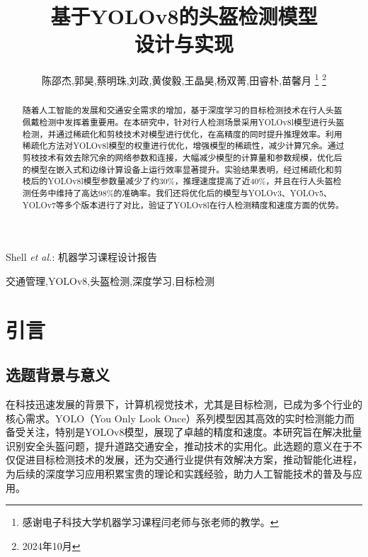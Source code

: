 \documentclass[journal]{IEEEtran}
\numberwithin{figure}{section}%
\begin{document}
\title{基于YOLOv8的头盔检测模型\\设计与实现}

\author{陈邵杰,郭昊,蔡明珠,刘政,黄俊毅,王晶昊,杨双菁,田睿朴,苗馨月%
\thanks{感谢电子科技大学机器学习课程闫老师与张老师的教学。}%
\thanks{2024年10月}}


%
{Shell \MakeLowercase{\textit{et al.}}: 机器学习课程设计报告}


\maketitle

\begin{abstract}
随着人工智能的发展和交通安全需求的增加，基于深度学习的目标检测技术在行人头盔佩戴检测中发挥着重要用。在本研究中，针对行人检测场景采用YOLOv8l模型进行头盔检测，并通过稀疏化和剪枝技术对模型进行优化，在高精度的同时提升推理效率。利用稀疏化方法对YOLOv8l模型的权重进行优化，增强模型的稀疏性，减少计算冗余。通过剪枝技术有效去除冗余的网络参数和连接，大幅减少模型的计算量和参数规模，优化后的模型在嵌入式和边缘计算设备上运行效率显著提升。实验结果表明，经过稀疏化和剪枝后的YOLOv8l模型参数量减少了约30\%，推理速度提高了近40\%，并且在行人头盔检测任务中维持了高达98\%的准确率。我们还将优化后的模型与YOLOv3、YOLOv5、YOLOv7等多个版本进行了对比，验证了YOLOv8l在行人检测精度和速度方面的优势。
\end{abstract}

\begin{IEEEkeywords}
交通管理,YOLOv8,头盔检测,深度学习,目标检测
\end{IEEEkeywords}

\IEEEpeerreviewmaketitle

\section{引言}

\subsection{选题背景与意义}
在科技迅速发展的背景下，计算机视觉技术，尤其是目标检测，已成为多个行业的核心需求。YOLO（You Only Look Once）系列模型因其高效的实时检测能力而备受关注，特别是YOLOv8模型，展现了卓越的精度和速度。本研究旨在解决批量识别安全头盔问题，提升道路交通安全，推动技术的实用化。此选题的意义在于不仅促进目标检测技术的发展，还为交通行业提供有效解决方案，推动智能化进程，为后续的深度学习应用积累宝贵的理论和实践经验，助力人工智能技术的普及与应用。
\end{document}
